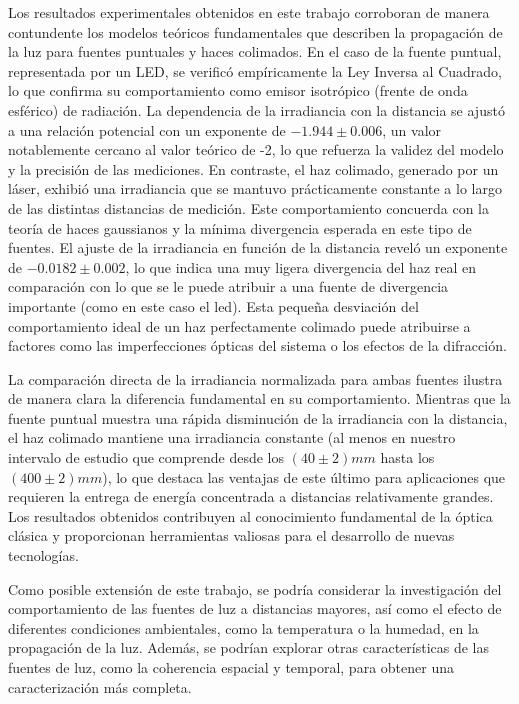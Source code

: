 Los resultados experimentales obtenidos en este trabajo corroboran de manera contundente los modelos teóricos fundamentales que describen la propagación de la luz para fuentes puntuales y haces colimados. En el caso de la fuente puntual, representada por un LED, se verificó empíricamente la Ley Inversa al Cuadrado, lo que confirma su comportamiento como emisor isotrópico (frente de onda esférico) de radiación. La dependencia de la irradiancia con la distancia se ajustó a una relación potencial con un exponente de $-1.944 \pm 0.006$, un valor notablemente cercano al valor teórico de -2, lo que refuerza la validez del modelo y la precisión de las mediciones. En contraste, el haz colimado, generado por un láser, exhibió una irradiancia que se mantuvo prácticamente constante a lo largo de las distintas distancias de medición. Este comportamiento concuerda con la teoría de haces gaussianos y la mínima divergencia esperada en este tipo de fuentes. El ajuste de la irradiancia en función de la distancia reveló un exponente de $-0.0182 \pm 0.002$, lo que indica una muy ligera divergencia del haz real en comparación con lo que se le puede atribuir a una fuente de divergencia importante (como en este caso el led). Esta pequeña desviación del comportamiento ideal de un haz perfectamente colimado puede atribuirse a factores como las imperfecciones ópticas del sistema o los efectos de la difracción.

La comparación directa de la irradiancia normalizada para ambas fuentes ilustra de manera clara la diferencia fundamental en su comportamiento. Mientras que la fuente puntual muestra una rápida disminución de la irradiancia con la distancia, el haz colimado mantiene una irradiancia constante (al menos en nuestro intervalo de estudio que comprende desde los $(40\pm2)mm$ hasta los $(400\pm2)mm$), lo que destaca las ventajas de este último para aplicaciones que requieren la entrega de energía concentrada a distancias relativamente grandes. Los resultados obtenidos contribuyen al conocimiento fundamental de la óptica clásica y proporcionan herramientas valiosas para el desarrollo de nuevas tecnologías.

Como posible extensión de este trabajo, se podría considerar la investigación del comportamiento de las fuentes de luz a distancias mayores, así como el efecto de diferentes condiciones ambientales, como la temperatura o la humedad, en la propagación de la luz. Además, se podrían explorar otras características de las fuentes de luz, como la coherencia espacial y temporal, para obtener una caracterización más completa.